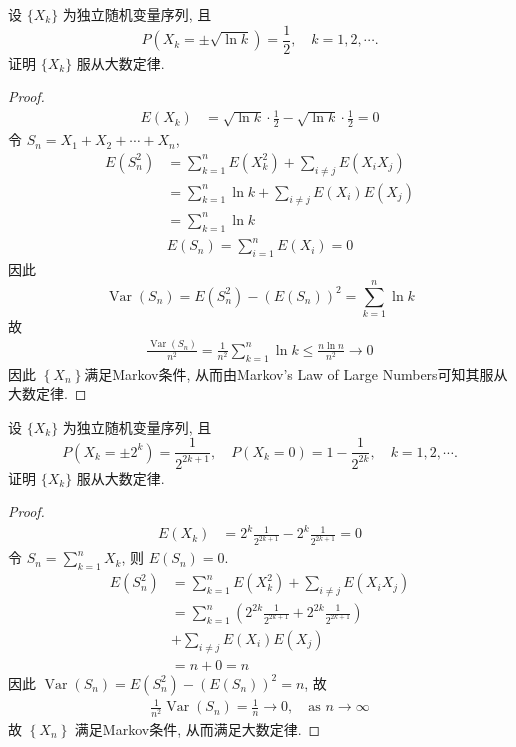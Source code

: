 \documentclass[../main.tex]{subfiles}
\begin{document}
\begin{exercise}{}{}
设 $\{X_k\}$ 为独立随机变量序列, 且
$$ P(X_k = \pm \sqrt{\ln k}) = \frac{1}{2}, \quad k=1, 2, \cdots. $$
证明 $\{X_k\}$ 服从大数定律.
\end{exercise}
\begin{proof}
 $$ \begin{aligned} E\left(X_{k}\right)&= \sqrt{\ln k}\cdot \frac{1}{2}-\sqrt{\ln k}\cdot \frac{1}{2}= 0 \end{aligned} $$
令 $S_{n}= X_1+ X_2+ \cdots + X_{n}$,
  $$ \begin{aligned} E\left(S_{n}^{2}\right)&= \sum _{k= 1}^{n}E\left(X_{k}^{2}\right)+ \sum _{i\neq j}E\left(X_{i}X_{j}\right)\\&= \sum _{k= 1}^{n}\ln k+ \sum _{i\neq j}E\left(X_{i}\right)E\left(X_{j}\right)  \\&= \sum _{k= 1}^{n}\ln k\end{aligned} $$
 $$ \begin{aligned} E\left(S_{n}\right)= \sum _{i= 1}^{n}E\left(X_{i}\right)= 0 \end{aligned} $$
因此
 $$ \operatorname{Var}\left(S_{n}\right)= E\left(S_{n}^{2}\right)-\left(E\left(S_{n}\right)\right)^{2}= \sum _{k= 1}^{n}\ln k $$   
故
 $$ \begin{aligned} \frac{\operatorname{Var}\left(S_{n}\right) }{n^{2} }= \frac{1 }{n^{2} }\sum _{k= 1}^{n}\ln k\le \frac{n\ln n }{n^{2} }\to 0  \end{aligned} $$
因此 $\left\{ X_{n} \right\}$满足Markov条件, 从而由Markov's Law of Large Numbers可知其服从大数定律.  
\end{proof}
\begin{exercise}{}{}
设 $\{X_k\}$ 为独立随机变量序列, 且
$$ P(X_k = \pm 2^k) = \frac{1}{2^{2k+1}}, \quad P(X_k = 0) = 1 - \frac{1}{2^{2k}}, \quad k=1, 2, \cdots. $$
证明 $\{X_k\}$ 服从大数定律.
\end{exercise}
\begin{proof}
 $$ \begin{aligned} E\left(X_{k}\right)&= 2^{k}\frac{1 }{2^{2k+ 1} }-2^{k}\frac{1 }{2^{2k+ 1} }= 0 \end{aligned} $$
令 $S_{n}= \sum _{k= 1}^{n}X_{k}$, 则 $E\left(S_{n}\right)= 0$. 
 $$ \begin{aligned} E\left(S_{n}^{2}\right)&=\sum _{k= 1}^{n}E\left(X_{k}^{2}\right)+ \sum _{i\neq j}E\left(X_{i}X_{j}\right)\\&=\sum _{k= 1}^{n}\left( 2^{2k}\frac{1 }{2^{2k+ 1} }+ 2^{2k}\frac{1 }{2^{2k+ 1} }\right)\\&+\sum _{i\neq j}E\left(X_{i}\right)E\left(X_{j}\right) \\&= n+ 0= n\end{aligned} $$
因此
$\operatorname{Var}\left(S_{n}\right)= E\left(S_{n}^{2}\right)-\left(E\left(S_{n}\right)\right)^{2}= n$, 故
 $$ \begin{aligned} \frac{1 }{n^{2} }\operatorname{Var}\left(S_{n}\right)= \frac{1 }{n }\to 0,\quad \text{as }n\to \infty \end{aligned} $$
故 $\left\{ X_{n} \right\}$   满足Markov条件, 从而满足大数定律.
\end{proof}
\end{document}
